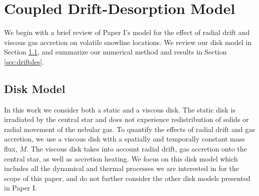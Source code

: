 \documentclass[apj]{emulateapj}
\begin{document}
\section{Coupled Drift-Desorption Model}
\label{sec:review}

We begin with a brief review of Paper I's model for the effect of radial drift and viscous gas accretion on volatile snowline locations. We review our disk model in Section \ref{sec:disktime}, and summarize our numerical method and results in Section \ref{sec:driftdes}.

\subsection{Disk Model}
\label{sec:disktime}

In this work we consider both a static and a viscous disk. The static disk is irradiated by the central star and does not experience redistribution of solids or radial movement of the nebular gas. To quantify the effects of radial drift and gas accretion, we use a viscous disk with a spatially and temporally constant mass flux, $\dot{M}$. The viscous disk takes into account radial drift, gas accretion onto the central star, as well as accretion heating. We focus on this disk model which includes all the dynamical and thermal processes we are interested in for the scope of this paper, and do not further consider the other disk models presented in Paper I.  
\end{document}
